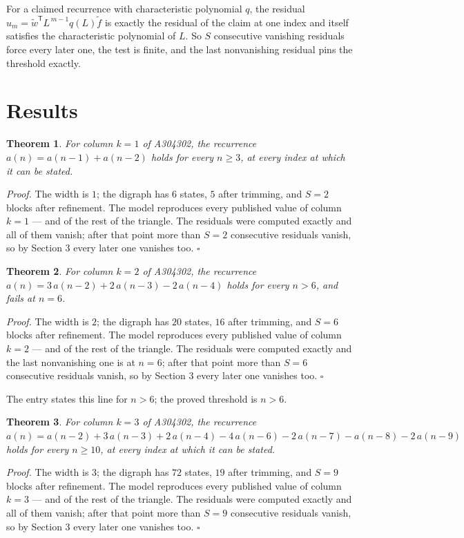 \documentclass[11pt]{article}
\newtheorem{theorem}{Theorem}
\theoremstyle{definition}
\begin{document}
For a claimed recurrence with characteristic polynomial $q$, the residual $u_m = \tilde w^{\mathsf T}L^{\,m-1}q(L)\tilde f$ is exactly the residual of the claim at one index and itself satisfies the characteristic polynomial of $L$. So $S$ consecutive vanishing residuals force every later one, the test is finite, and the last nonvanishing residual pins the threshold exactly.

\section{Results}

\begin{theorem} For column $k = 1$ of A304302, the recurrence $a(n) = a(n-1) + a(n-2)$ holds for every $n \ge 3$, at every index at which it can be stated.\end{theorem}

{\itshape Proof.} The width is $1$; the digraph has $6$ states, $5$ after trimming, and $S = 2$ blocks after refinement. The model reproduces every published value of column $k = 1$ --- and of the rest of the triangle. The residuals were computed exactly and all of them vanish; after that point more than $S = 2$ consecutive residuals vanish, so by Section 3 every later one vanishes too. $\square$

\begin{theorem} For column $k = 2$ of A304302, the recurrence $a(n) = 3\,a(n-2) + 2\,a(n-3) - 2\,a(n-4)$ holds for every $n > 6$, and fails at $n = 6$.\end{theorem}

{\itshape Proof.} The width is $2$; the digraph has $20$ states, $16$ after trimming, and $S = 6$ blocks after refinement. The model reproduces every published value of column $k = 2$ --- and of the rest of the triangle. The residuals were computed exactly and the last nonvanishing one is at $n = 6$; after that point more than $S = 6$ consecutive residuals vanish, so by Section 3 every later one vanishes too. $\square$

The entry states this line for $n > 6$; the proved threshold is $n > 6$.

\begin{theorem} For column $k = 3$ of A304302, the recurrence $a(n) = a(n-2) + 3\,a(n-3) + 2\,a(n-4) - 4\,a(n-6) - 2\,a(n-7) - a(n-8) - 2\,a(n-9)$ holds for every $n \ge 10$, at every index at which it can be stated.\end{theorem}

{\itshape Proof.} The width is $3$; the digraph has $72$ states, $19$ after trimming, and $S = 9$ blocks after refinement. The model reproduces every published value of column $k = 3$ --- and of the rest of the triangle. The residuals were computed exactly and all of them vanish; after that point more than $S = 9$ consecutive residuals vanish, so by Section 3 every later one vanishes too. $\square$
\end{document}
